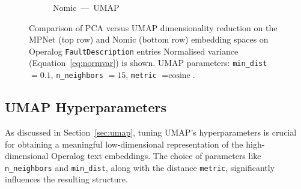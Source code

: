 \documentclass[10pt,oneside]{report}
\begin{document}
\begin{figure}[htbp]
\begin{subfigure}[b]{0.48\textwidth}
    \caption{Nomic --- UMAP}
    \label{fig:umapTest-nomic}
  \end{subfigure}
  \caption{Comparison of PCA versus UMAP dimensionality reduction on the MPNet (top row) and Nomic (bottom row) embedding spaces on Operalog \texttt{FaultDescription} entries Normalised variance (Equation~\ref{eq:normvar}) is shown. UMAP parameters: \texttt{min\_dist} $=0.1$, \texttt{n\_neighbors} $=15$, \texttt{metric} $= \text{cosine}$.}
  \label{fig:dimred-compare}
\end{figure}


\subsection{UMAP Hyperparameters}

%
%


As discussed in Section~\ref{sec:umap}, %
tuning UMAP's hyperparameters is crucial for obtaining a meaningful low-dimensional representation of the high-dimensional Operalog text embeddings. The choice of parameters like \texttt{n\_neighbors} and \texttt{min\_dist}, along with the distance \texttt{metric}, significantly influences the resulting structure.
\end{document}
